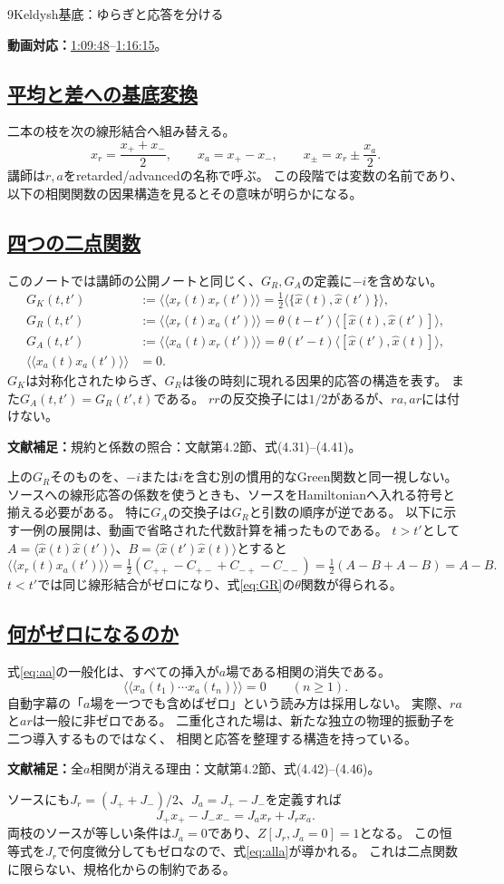 \documentclass[a4paper,11pt]{ltjsarticle}
\newcommand{\subsectionlink}[1]{\subsection[#1]{\hyperlink{toc}{#1}}}
\numberwithin{equation}{section}
\newcommand{\av}[1]{\langle #1\rangle}
\newcommand{\pav}[1]{\langle\!\langle #1\rangle\!\rangle}
\newcommand{\video}[2]{\href{https://www.youtube.com/watch?v=RYxzcUhIHjk\&t=#1s}{#2}}
\newcommand{\videosource}[1]{\par\noindent\textcolor{noteblue}{\textbf{動画対応：}#1}\par\smallskip}
\newcommand{\supplement}[1]{\par\medskip\noindent\textcolor{notered}{\textbf{文献補足：}}#1\par\smallskip}
\begin{document}
\begin{lecturesection}{9}{Keldysh基底：ゆらぎと応答を分ける}
\label{sec:keldysh}
\videosource{\video{4188}{1:09:48}--\video{4575}{1:16:15}。}
\subsectionlink{平均と差への基底変換}
二本の枝を次の線形結合へ組み替える。
\begin{equation}
 x_r=\frac{x_++x_-}{2},\qquad x_a=x_+-x_-,\qquad
 x_\pm=x_r\pm\frac{x_a}{2}.
 \label{eq:ra}
\end{equation}
講師は$r,a$をretarded/advancedの名称で呼ぶ。
この段階では変数の名前であり、以下の相関関数の因果構造を見るとその意味が明らかになる。

\subsectionlink{四つの二点関数}
このノートでは講師の公開ノートと同じく、$G_R,G_A$の定義に$-i$を含めない。
\begin{align}
 G_K(t,t')&:=\pav{x_r(t)x_r(t')}
       =\frac12\av{\{\hat x(t),\hat x(t')\}},\label{eq:GK}\\
 G_R(t,t')&:=\pav{x_r(t)x_a(t')}
       =\theta(t-t')\av{[\hat x(t),\hat x(t')]},\label{eq:GR}\\
 G_A(t,t')&:=\pav{x_a(t)x_r(t')}
       =\theta(t'-t)\av{[\hat x(t'),\hat x(t)]},\label{eq:GA}\\
 \pav{x_a(t)x_a(t')}&=0.\label{eq:aa}
\end{align}
$G_K$は対称化されたゆらぎ、$G_R$は後の時刻に現れる因果的応答の構造を表す。
また$G_A(t,t')=G_R(t',t)$である。
$rr$の反交換子には$1/2$があるが、$ra,ar$には付けない。

\supplement{規約と係数の照合：文献\cite{Pajer:2026fuo}第4.2節、式(4.31)--(4.41)。}
上の$G_R$そのものを、$-i$または$i$を含む別の慣用的なGreen関数と同一視しない。
ソースへの線形応答の係数を使うときも、ソースをHamiltonianへ入れる符号と揃える必要がある。
特に$G_A$の交換子は$G_R$と引数の順序が逆である。
以下に示す一例の展開は、動画で省略された代数計算を補ったものである。
$t>t'$として$A=\av{\hat x(t)\hat x(t')}$、$B=\av{\hat x(t')\hat x(t)}$とすると
\begin{equation}
 \pav{x_r(t)x_a(t')}
   =\tfrac12(C_{++}-C_{+-}+C_{-+}-C_{--})
   =\tfrac12(A-B+A-B)=A-B.
\end{equation}
$t<t'$では同じ線形結合がゼロになり、式\eqref{eq:GR}の$\theta$関数が得られる。

\subsectionlink{何がゼロになるのか}
式\eqref{eq:aa}の一般化は、すべての挿入が$a$場である相関の消失である。
\begin{equation}
 \pav{x_a(t_1)\cdots x_a(t_n)}=0\qquad(n\ge1).
 \label{eq:alla}
\end{equation}
自動字幕の「$a$場を一つでも含めばゼロ」という読み方は採用しない。
実際、$ra$と$ar$は一般に非ゼロである。
二重化された場は、新たな独立の物理的振動子を二つ導入するものではなく、
相関と応答を整理する構造を持っている。

\supplement{全$a$相関が消える理由：文献\cite{Pajer:2026fuo}第4.2節、式(4.42)--(4.46)。}
ソースにも$J_r=(J_++J_-)/2$、$J_a=J_+-J_-$を定義すれば
\begin{equation}
 J_+x_+-J_-x_-=J_a x_r+J_r x_a.
\end{equation}
両枝のソースが等しい条件は$J_a=0$であり、$Z[J_r,J_a=0]=1$となる。
この恒等式を$J_r$で何度微分してもゼロなので、式\eqref{eq:alla}が導かれる。
これは二点関数に限らない、規格化からの制約である。
\end{lecturesection}
\end{document}
